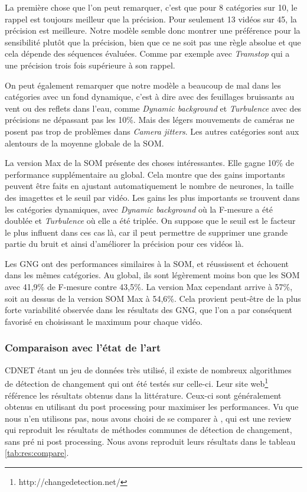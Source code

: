 	La première chose que l'on peut remarquer, c'est que pour 8 catégories sur 10, le rappel est toujours meilleur que la précision. Pour seulement 13 vidéos sur 45, la précision est meilleure. Notre modèle semble donc montrer une préférence pour la sensibilité plutôt que la précision, bien que ce ne soit pas une règle absolue et que cela dépende des séquences évaluées. Comme par exemple avec \textit{Tramstop} qui a une précision trois fois supérieure à son rappel.

	On peut également remarquer que notre modèle a beaucoup de mal dans les catégories avec un fond dynamique, c'est à dire avec des feuillages bruissants au vent ou des reflets dans l'eau, comme \textit{Dynamic background} et \textit{Turbulence} avec des précisions ne dépassant pas les 10\%. Mais des légers mouvements de caméras ne posent pas trop de problèmes dans \textit{Camera jitters}. Les autres catégories sont aux alentours de la moyenne globale de la SOM.

	La version Max de la SOM présente des choses intéressantes. Elle gagne 10\% de performance supplémentaire au global. Cela montre que des gains importants peuvent être faits en ajustant automatiquement le nombre de neurones, la taille des imagettes et le seuil par vidéo. Les gains les plus importants se trouvent dans les catégories dynamiques, avec \textit{Dynamic background} où la F-mesure a été doublée et \textit{Turbulence} où elle a été triplée. On suppose que le seuil est le facteur le plus influent dans ces cas là, car il peut permettre de supprimer une grande partie du bruit et ainsi d'améliorer la précision pour ces vidéos là.

	Les GNG ont des performances similaires à la SOM, et réussissent et échouent dans les mêmes catégories. Au global, ils sont légèrement moins bon que les SOM avec 41,9\% de F-mesure contre 43,5\%. La version Max cependant arrive à 57\%, soit au dessus de la version SOM Max à 54,6\%. Cela provient peut-être de la plus forte variabilité observée dans les résultats des GNG, que l'on a par conséquent favorisé en choisissant le maximum pour chaque vidéo. 

	\subsubsection{Comparaison avec l'état de l'art}

	CDNET étant un jeu de données très utilisé, il existe de nombreux algorithmes de détection de changement qui ont été testés sur celle-ci. Leur site web\footnote{http://changedetection.net/} référence les résultats obtenus dans la littérature. Ceux-ci sont généralement obtenus en utilisant du post processing pour maximiser les performances. Vu que nous n'en utilisons pas, nous avons choisi de se comparer à \cite{xu2016background}, qui est une review qui reproduit les résultats de méthodes communes de détection de changement, sans pré ni post processing. Nous avons reproduit leurs résultats dans le tableau \ref{tab:res:compare}.

